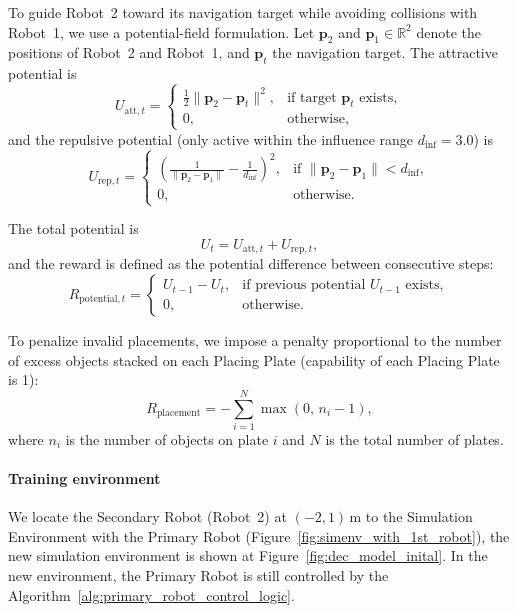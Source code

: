 \documentclass[english, 12pt, a4paper, elec, utf8, a-2b, online]{aaltothesis}
\begin{document}
To guide Robot~2 toward its navigation target while avoiding collisions with Robot~1, we use a potential-field formulation.  
Let $\mathbf{p}_2$ and $\mathbf{p}_1 \in \mathbb{R}^2$ denote the positions of Robot~2 and Robot~1, and $\mathbf{p}_t$ the navigation target.  
The attractive potential is
\begin{equation}
U_{\mathrm{att},t} =
\begin{cases}
\tfrac{1}{2}\|\mathbf{p}_2 - \mathbf{p}_t\|^2, & \text{if target }\mathbf{p}_t \text{ exists}, \\[6pt]
0, & \text{otherwise},
\end{cases}
\end{equation}
and the repulsive potential (only active within the influence range $d_\text{inf}=3.0$) is
\begin{equation}
U_{\mathrm{rep},t} =
\begin{cases}
\left(\tfrac{1}{\|\mathbf{p}_2 - \mathbf{p}_1\|} - \tfrac{1}{d_\text{inf}}\right)^2, & \text{if }\|\mathbf{p}_2-\mathbf{p}_1\| < d_\text{inf}, \\[6pt]
0, & \text{otherwise}.
\end{cases}
\end{equation}

The total potential is
\begin{equation}
U_t = U_{\mathrm{att},t} + U_{\mathrm{rep},t},
\end{equation}
and the reward is defined as the potential difference between consecutive steps:
\begin{equation}
R_{\mathrm{potential},t} =
\begin{cases}
U_{t-1} - U_t, & \text{if previous potential $U_{t-1}$ exists}, \\[4pt]
0, & \text{otherwise}.
\end{cases}
\end{equation}

To penalize invalid placements, we impose a penalty proportional to the number of excess objects stacked on each Placing Plate (capability of each Placing Plate is 1):
\begin{equation}
R_\text{placement} = - \sum_{i=1}^N \max(0, \, n_i - 1),
\end{equation}
where $n_i$ is the number of objects on plate $i$ and $N$ is the total number of plates.

\paragraph{Training environment}
We locate the Secondary Robot (Robot~2) at $(-2, 1)\,\text{m}$ to the Simulation Environment with the Primary Robot (Figure~\ref{fig:simenv_with_1st_robot}), the new simulation environment is shown at Figure~\ref{fig:dec_model_inital}. In the new environment, the Primary Robot is still controlled by the Algorithm~\ref{alg:primary_robot_control_logic}.
\end{document}
